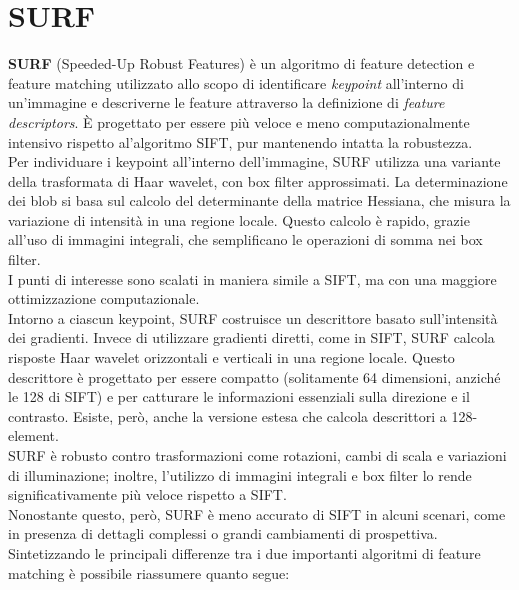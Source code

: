 \documentclass[12pt,a4paper,openright,twoside]{book}
\begin{document}
\section{SURF}
\textbf{SURF} (Speeded-Up Robust Features) è un algoritmo di feature detection e feature matching utilizzato allo scopo di identificare {\itshape keypoint} all'interno di un'immagine e descriverne le feature attraverso la definizione di {\itshape feature descriptors}. È progettato per essere più veloce e meno computazionalmente intensivo rispetto al'algoritmo SIFT, pur mantenendo intatta la robustezza.\\
Per individuare i keypoint all'interno dell'immagine, SURF utilizza una variante della trasformata di Haar wavelet, con box filter approssimati. La determinazione dei blob si basa sul calcolo del determinante della matrice Hessiana, che misura la variazione di intensità in una regione locale. Questo calcolo è rapido, grazie all'uso di immagini integrali, che semplificano le operazioni di somma nei box filter.\\
I punti di interesse sono scalati in maniera simile a SIFT, ma con una maggiore ottimizzazione computazionale.\\
Intorno a ciascun keypoint, SURF costruisce un descrittore basato sull'intensità dei gradienti. Invece di utilizzare gradienti diretti, come in SIFT, SURF calcola risposte Haar wavelet orizzontali e verticali in una regione locale.
Questo descrittore è progettato per essere compatto (solitamente 64 dimensioni, anziché le 128 di SIFT) e per catturare le informazioni essenziali sulla direzione e il contrasto. Esiste, però, anche la versione estesa che calcola descrittori a 128-element.\\
SURF è robusto contro trasformazioni come rotazioni, cambi di scala e variazioni di illuminazione; inoltre, l'utilizzo di immagini integrali e box filter lo rende significativamente più veloce rispetto a SIFT.\\
Nonostante questo, però, SURF è meno accurato di SIFT in alcuni scenari, come in presenza di dettagli complessi o grandi cambiamenti di prospettiva.\\
Sintetizzando le principali differenze tra i due importanti algoritmi di feature matching è possibile riassumere quanto segue:
\end{document}
